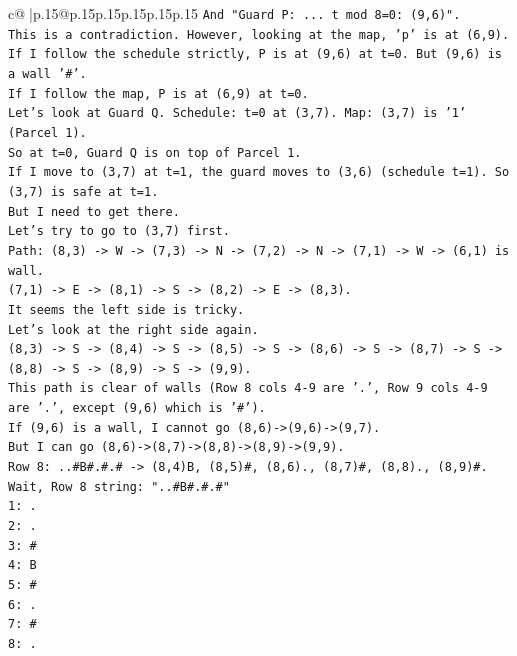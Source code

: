 \documentclass{article}
\begin{document}
{\begin{supertabular}{c@{$\;$}|p{.15\linewidth}@{}p{.15\linewidth}p{.15\linewidth}p{.15\linewidth}p{.15\linewidth}p{.15\linewidth}}
{{{\texttt{And "Guard P: ... t mod 8=0: (9,6)".} \\
\texttt{This is a contradiction. However, looking at the map, 'p' is at (6,9).} \\
\texttt{If I follow the schedule strictly, P is at (9,6) at t=0. But (9,6) is a wall '\#'.} \\
\texttt{If I follow the map, P is at (6,9) at t=0.} \\
\texttt{Let's look at Guard Q. Schedule: t=0 at (3,7). Map: (3,7) is '1' (Parcel 1).} \\
\texttt{So at t=0, Guard Q is on top of Parcel 1.} \\
\texttt{If I move to (3,7) at t=1, the guard moves to (3,6) (schedule t=1). So (3,7) is safe at t=1.} \\
\texttt{But I need to get there.} \\
\texttt{Let's try to go to (3,7) first.} \\
\texttt{Path: (8,3) {-}> W {-}> (7,3) {-}> N {-}> (7,2) {-}> N {-}> (7,1) {-}> W {-}> (6,1) is wall.} \\
\texttt{(7,1) {-}> E {-}> (8,1) {-}> S {-}> (8,2) {-}> E {-}> (8,3).} \\
\texttt{It seems the left side is tricky.} \\
\texttt{Let's look at the right side again.} \\
\texttt{(8,3) {-}> S {-}> (8,4) {-}> S {-}> (8,5) {-}> S {-}> (8,6) {-}> S {-}> (8,7) {-}> S {-}> (8,8) {-}> S {-}> (8,9) {-}> S {-}> (9,9).} \\
\texttt{This path is clear of walls (Row 8 cols 4{-}9 are '.', Row 9 cols 4{-}9 are '.', except (9,6) which is '\#').} \\
\texttt{If (9,6) is a wall, I cannot go (8,6){-}>(9,6){-}>(9,7).} \\
\texttt{But I can go (8,6){-}>(8,7){-}>(8,8){-}>(8,9){-}>(9,9).} \\
\texttt{Row 8: ..\#B\#.\#.\# {-}> (8,4)B, (8,5)\#, (8,6)., (8,7)\#, (8,8)., (8,9)\#.} \\
\texttt{Wait, Row 8 string: "..\#B\#.\#.\#"} \\
\texttt{1: .} \\
\texttt{2: .} \\
\texttt{3: \#} \\
\texttt{4: B} \\
\texttt{5: \#} \\
\texttt{6: .} \\
\texttt{7: \#} \\
\texttt{8: .} \\
}}}
\end{supertabular}}
\end{document}
